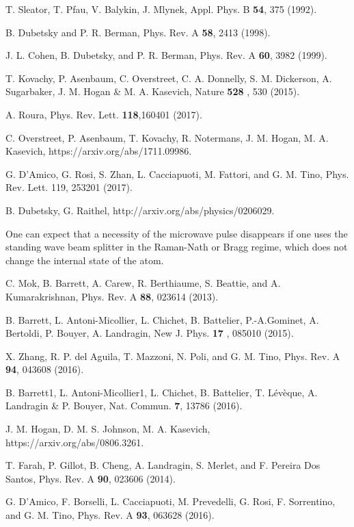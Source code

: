 \documentclass[twocolumn,showpacs,preprintnumbers]{revtex4}
\begin{document}
\begin{thebibliography}{99}
 T. Sleator, T. Pfau, V. Balykin, J. Mlynek, Appl. Phys. B 
\textbf{54}, 375 (1992).

 B. Dubetsky and P. R. Berman, Phys. Rev. A \textbf{58}, 2413
(1998).

 J. L. Cohen, B. Dubetsky, and P. R. Berman, Phys. Rev. A 
\textbf{60}, 3982 (1999).

 T. Kovachy, P. Asenbaum, C. Overstreet, C. A. Donnelly, S. M.
Dickerson, A. Sugarbaker, J. M. Hogan \& M. A. Kasevich, Nature \textbf{528}%
, 530 (2015).

 A. Roura, Phys. Rev. Lett. \textbf{118},160401 (2017).

 C. Overstreet, P. Asenbaum, T. Kovachy, R. Notermans, J. M.
Hogan, M. A. Kasevich, https://arxiv.org/abs/1711.09986.

 G. D'Amico, G. Rosi, S. Zhan, L. Cacciapuoti, M. Fattori,
and G. M. Tino, Phys. Rev. Lett. 119, 253201 (2017).

 B. Dubetsky, G. Raithel, http://arxiv.org/abs/physics/0206029.

 One can expect that a necessity of the microwave pulse
disappears if one uses the standing wave beam splitter \cite{c1} in the
Raman-Nath or Bragg regime, which does not change the internal state of the
atom.

 C. Mok, B. Barrett, A. Carew, R. Berthiaume, S. Beattie, and
A. Kumarakrishnan, Phys. Rev. A \textbf{88}, 023614 (2013).

 B. Barrett, L. Antoni-Micollier, L. Chichet, B. Battelier,
P.-A.Gominet, A. Bertoldi, P. Bouyer, A. Landragin, New J. Phys. \textbf{17}%
, 085010 (2015).

 X. Zhang, R. P. del Aguila, T. Mazzoni, N. Poli, and G. M.
Tino, Phys. Rev. A \textbf{94}, 043608 (2016).

 B. Barrett1, L. Antoni-Micollier1, L. Chichet, B. Battelier,
T. L\'{e}v\`{e}que, A. Landragin \& P. Bouyer, Nat. Commun. \textbf{7},
13786 (2016).

 J. M. Hogan, D. M. S. Johnson, M. A. Kasevich,
https://arxiv.org/abs/0806.3261.

 T. Farah, P. Gillot, B. Cheng, A. Landragin, S. Merlet, and F.
Pereira Dos Santos, Phys. Rev. A \textbf{90}, 023606 (2014).

 G. D'Amico, F. Borselli, L. Cacciapuoti, M. Prevedelli, G.
Rosi, F. Sorrentino, and G. M. Tino, Phys. Rev. A \textbf{93}, 063628 (2016).


\end{thebibliography}
\end{document}
